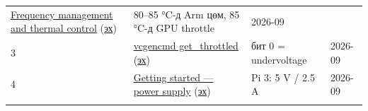 \begin{longtable}[]{@{}llll@{}}
\begin{minipage}[t]{0.22\columnwidth}
\href{https://www.raspberrypi.com/documentation/computers/raspberry-pi.html\#frequency-management-and-thermal-control}{Frequency management and thermal control} (\href{https://github.com/raspberrypi/documentation/blob/develop/documentation/asciidoc/computers/raspberry-pi/frequency-management.adoc}{эх})\strut
\end{minipage} & \begin{minipage}[t]{0.22\columnwidth}\raggedright
80--85 °C-д Arm цөм, 85 °C-д GPU throttle\strut
\end{minipage} & \begin{minipage}[t]{0.22\columnwidth}\raggedright
2026-09\strut
\end{minipage}\tabularnewline
\begin{minipage}[t]{0.22\columnwidth}\raggedright
3\strut
\end{minipage} & \begin{minipage}[t]{0.22\columnwidth}\raggedright
\href{https://www.raspberrypi.com/documentation/computers/os.html\#vcgencmd}{vcgencmd get\_\allowbreak{}throttled} (\href{https://github.com/raspberrypi/documentation/blob/develop/documentation/asciidoc/computers/os/graphics-utilities.adoc}{эх})\strut
\end{minipage} & \begin{minipage}[t]{0.22\columnwidth}\raggedright
бит 0 = undervoltage\strut
\end{minipage} & \begin{minipage}[t]{0.22\columnwidth}\raggedright
2026-09\strut
\end{minipage}\tabularnewline
\begin{minipage}[t]{0.22\columnwidth}\raggedright
4\strut
\end{minipage} & \begin{minipage}[t]{0.22\columnwidth}\raggedright
\href{https://www.raspberrypi.com/documentation/computers/getting-started.html}{Getting started --- power supply} (\href{https://github.com/raspberrypi/documentation/blob/develop/documentation/asciidoc/computers/getting-started/setting-up.adoc}{эх})\strut
\end{minipage} & \begin{minipage}[t]{0.22\columnwidth}\raggedright
Pi 3: 5 V / 2.5 A\strut
\end{minipage} & \begin{minipage}[t]{0.22\columnwidth}\raggedright
2026-09\strut
\end{minipage}\tabularnewline
\begin{minipage}[t]{0.22\columnwidth}\raggedright

\end{minipage}
\end{longtable}
